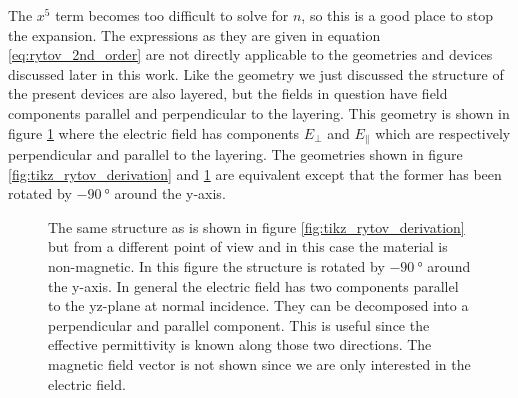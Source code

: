 The $x^5$ term becomes too difficult to solve for $n$, so this is a good place to stop the expansion. The expressions as they are given in equation \ref{eq:rytov_2nd_order} are not directly applicable to the geometries and devices discussed later in this work. Like the geometry we just discussed the structure of the present devices are also layered, but the fields in question have field components parallel and perpendicular to the layering. This geometry is shown in figure \ref{fig:stratified_structure} where the electric field has components $E_{\bot}$ and $E_{\parallel}$ which are respectively perpendicular and parallel to the layering. The geometries shown in figure \ref{fig:tikz_rytov_derivation} and \ref{fig:stratified_structure} are equivalent except that the former has been rotated by $\SI{-90}{\degree}$ around the y-axis. 

\begin{figure}[h]
    \centering
    
    \caption{The same structure as is shown in figure \ref{fig:tikz_rytov_derivation} but from a different point of view and in this case the material is non-magnetic. In this figure the structure is rotated by $\SI{-90}{\degree}$ around the y-axis. In general the electric field has two components parallel to the yz-plane at normal incidence. They can be decomposed into a perpendicular and parallel component. This is useful since the effective permittivity is known along those two directions. The magnetic field vector is not shown since we are only interested in the electric field.}
    \label{fig:stratified_structure}
\end{figure}

